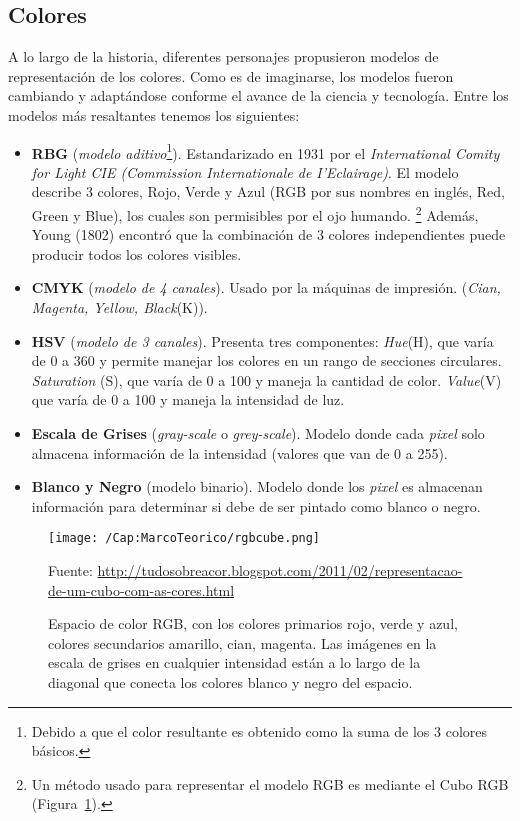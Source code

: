   \subsection{Colores}
  \label{cap-marcoteorico:modelo-color}
    A lo largo de la historia, diferentes personajes propusieron modelos de 
    representación de los colores. Como es de imaginarse, los modelos fueron 
    cambiando y adaptándose conforme el avance de la ciencia y tecnología. 
    Entre los modelos más resaltantes tenemos los siguientes:
      \begin{itemize}
        \item \textbf{RBG} (\textit{modelo aditivo}\footnote{Debido a que el 
        color resultante es obtenido como la suma de los 3 colores básicos.}).
        Estandarizado en 1931 por el \textit{International Comity for Light 
        CIE (Commission Internationale de I'Eclairage)}. El modelo describe 
        3 colores, Rojo, Verde y Azul (RGB por sus nombres en inglés, Red, 
        Green y Blue), los cuales son permisibles por el ojo humando. 
        \footnote{Un método usado para representar el modelo RGB es mediante 
        el Cubo RGB (Figura~\ref{Fig:Cap-marcoteorico:CuboRGB}).} Además, 
        Young (1802) encontró que la combinación de 3 colores independientes 
        puede producir todos los colores visibles.
        \item \textbf{CMYK} (\textit{modelo de 4 canales}). Usado por la 
        máquinas de impresión. (\textit{Cian, Magenta, Yellow, Black}(K)).
        \item \textbf{HSV} (\textit{modelo de 3 canales}). Presenta tres 
        componentes: \textit{Hue}(H), que varía de 0 a 360 y permite manejar 
        los colores en un rango de secciones circulares. \textit{Saturation}
        (S), que varía de 0 a 100 y maneja la cantidad de color. 
        \textit{Value}(V) que varía de 0 a 100 y maneja la intensidad de luz.
        \item \textbf{Escala de Grises} (\textit{gray-scale} o 
        \textit{grey-scale}). Modelo donde cada \textit{pixel} solo almacena 
        información de la intensidad (valores que van de 0 a 255).
        \item \textbf{Blanco y Negro} (modelo binario). Modelo donde los 
        \textit{pixel} es almacenan información para determinar si debe de ser
        pintado como blanco o negro.
      \end{itemize}
      \begin{figure}[h!]
		    \centering
		    \texttt{[image: /Cap:MarcoTeorico/rgbcube.png]}
		    \caption[Espacio de color RGB]{Espacio de color RGB, con los colores 
		    primarios rojo, verde y azul, colores secundarios amarillo, cian, 
		    magenta. Las imágenes en la escala de grises en cualquier intensidad 
		    están a lo largo de la diagonal que conecta los colores blanco y negro 
		    del espacio.}
		    \tiny{Fuente: \url{http://tudosobreacor.blogspot.com/2011/02/representacao-de-um-cubo-com-as-cores.html}}
		    \label{Fig:Cap-marcoteorico:CuboRGB}
	    \end{figure}
